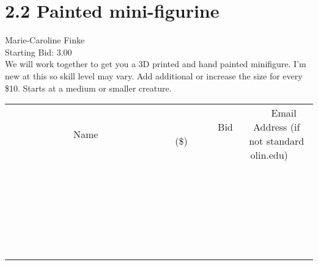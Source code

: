 \documentclass[11pt]{article}
\begin{document}
					\section*{2.2 Painted mini-figurine}
					Marie-Caroline Finke \\
					Starting Bid: 3.00 \\
					We will work together to get you a 3D printed and hand painted minifigure. I'm new at this so skill level may vary. Add additional or increase the size for every \$10. Starts at a medium or smaller creature. \\
					[6ex]
					\begin{tabular}{c c c}
						~~~~~~~~~~~~~Name~~~~~~~~~~~~~ & ~~~~~~~~~Bid (\$)~~~~~~~~~ & ~~~Email Address (if not standard olin.edu)~~~ \\
				
 & & \\
\hline
 & & \\
\hline
 & & \\
\hline
 & & \\
\hline
 & & \\
\hline
 & & \\
\hline
 & & \\
\hline
 & & \\
\hline
 & & \\
\hline
 & & \\
\hline
 & & \\
\hline
 & & \\
\hline
 & & \\
\hline
 & & \\
\hline
 & & \\
\hline
 & & \\
\hline
 & & \\
\hline
 & & \\
\hline
 & & \\
\hline
 & & \\
\hline
 & & \\
\hline
 & & \\
\hline
 & & \\
\hline
 & & \\
\hline
 & & \\
\hline
 & & \\
\hline
					\end{tabular}
					\clearpage
				
\end{document}
